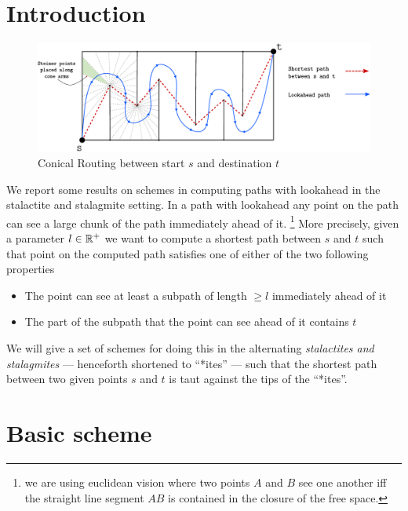 \section{Introduction}%




\begin{figure}[H]
\centering
\includegraphics[width=16cm]{miscimages/stalactites-stalagmites.pdf}
\caption{Conical Routing between start $s$ and destination $t$}
\label{fig:conical-routing}
\end{figure}

We report some results on schemes in computing paths with lookahead in the stalactite and stalagmite setting. In a path with lookahead
any point on the path can see a large chunk of the path immediately ahead of it. \footnote{we are using euclidean vision where two points $A$ and $B$ see one another
iff the straight line segment $AB$ is contained in the closure of the free space. } More precisely, given a parameter $l\in \mathbb{R}^{+}$ we want to compute a shortest 
path between $s$ and $t$ such that point on the computed path satisfies one of either of the two following properties


\begin{itemize}
\item The point can see at least a subpath of length $\geq l$ immediately ahead of it
\item The part of the subpath that the point can see ahead of it contains $t$
\end{itemize}

We will give a set of schemes for doing this in the alternating \textit{stalactites and stalagmites} --- henceforth shortened to ``*ites'' --- such that the shortest path 
between two given points $s$ and $t$ is taut against the tips of the ``*ites''. 



\section{Basic scheme}



